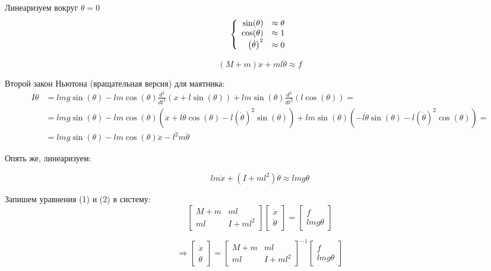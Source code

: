 \documentclass{article}
\begin{document}
Линеаризуем вокруг $\theta=0$
$$
\left \{ \begin{array}{r l}
\sin(\theta) & \approx \theta \\
\cos(\theta) & \approx 1      \\
\left(\dot{\theta}\right)^2 & \approx 0
\end{array} \right.
$$


\begin{equation}
(M+m)\ddot{x} + ml\ddot{\theta} \approx f
\end{equation}


Второй закон Ньютона (вращательная версия) для маятника:
\begin{align*}
I\ddot{\theta} & = lmg\sin(\theta) - lm\cos(\theta)\frac{d^2}{dt^2}(x + l\sin(\theta)) + lm\sin(\theta)\frac{d^2}{dt^2}(l\cos(\theta)) = \\
               & = lmg\sin(\theta) - lm\cos(\theta)\left(\ddot{x} + l\ddot{\theta}\cos(\theta) - l\left(\dot{\theta}\right)^2\sin(\theta)\right) + lm\sin(\theta)\left(-l\ddot{\theta}\sin(\theta) - l\left(\dot{\theta}\right)^2\cos(\theta) \right) = \\
               & = lmg\sin(\theta) - lm\cos(\theta)\ddot{x} - l^2m\ddot{\theta}
\end{align*}

Опять же, линеаризуем:

\begin{equation}
lm\ddot{x} + (I+ml^2)\ddot{\theta} \approx lmg \theta
\end{equation}


Запишем уравнения (1) и (2) в систему:
$$
\begin{bmatrix}M+m & ml \\ ml & I+ml^2\end{bmatrix}\begin{bmatrix}\ddot{x}\\ \ddot{\theta}\end{bmatrix} = \begin{bmatrix}f\\ lmg\theta\end{bmatrix}
$$

$$
\Rightarrow\begin{bmatrix}\ddot{x}\\ \ddot{\theta}\end{bmatrix} = \begin{bmatrix}M+m & ml \\ ml & I+ml^2\end{bmatrix}^{-1}\begin{bmatrix}f\\ lmg\theta\end{bmatrix}
$$
\end{document}
